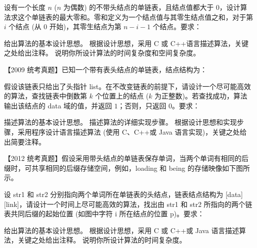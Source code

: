 \begin{qitems}
    \begin{bbox}
        \qitem 设有一个长度 $n$ ($n$ 为偶数) 的不带头结点的单链表，且结点值都大于 $0$，设计算法求这个单链表的最大零和。零和定义为一个结点值与其零生结点值之和，对于第 $i$ 个结点 (从 $0$ 开始)，其零生结点为第 $n-i-1$ 个结点。要求：
        \begin{subqitems}
            \subqitem 给出算法的基本设计思想。
            \subqitem 根据设计思想，采用 C 或 C++语言描述算法，关键之处给出注释。
            \subqitem 说明你所设计算法的时间复杂度和空间复杂度。
        \end{subqitems}
    \end{bbox}

    \begin{bbox}
        \qitem 【2009 统考真题】已知一个带有表头结点的单链表，结点结构为：
        \begin{center}
        \end{center}
        假设该链表只给出了头指针 list。在不改变链表的前提下，请设计一个尽可能高效的算法，查找链表中倒数第 $k$ 个位置上的结点 ($k$ 为正整数)。若查找成功，算法输出该结点的 data 域的值，并返回 $1$；否则，只返回 $0$。要求：
        \begin{subqitems}
            \subqitem 描述算法的基本设计思想。
            \subqitem 描述算法的详细实现步骤。
            \subqitem 根据设计思想和实现步骤，采用程序设计语言描述算法 (使用 C、C++或 Java 语言实现)，关键之处给出简要注释。
        \end{subqitems}
    \end{bbox}

    \begin{bbox}
        \qitem 【2012 统考真题】假设采用带头结点的单链表保存单词，当两个单词有相同的后缀时，可共享相同的后缀存储空间，例如，loading 和 being 的存储映像如下图所示。
        

        设 str1 和 str2 分别指向两个单词所在单链表的头结点，链表结点结构为 [data] [link]，请设计一个时间上尽可能高效的算法，找出由 str1 和 str2 所指向的两个链表共同后缀的起始位置 (如图中字符 i 所在结点的位置 p)。要求：
        \begin{subqitems}
            \subqitem 给出算法的基本设计思想。
            \subqitem 根据设计思想，采用 C 或 C++或 Java 语言描述算法，关键之处给出注释。
            \subqitem 说明你所设计算法的时间复杂度。
        \end{subqitems}
    \end{bbox}


\end{qitems}
